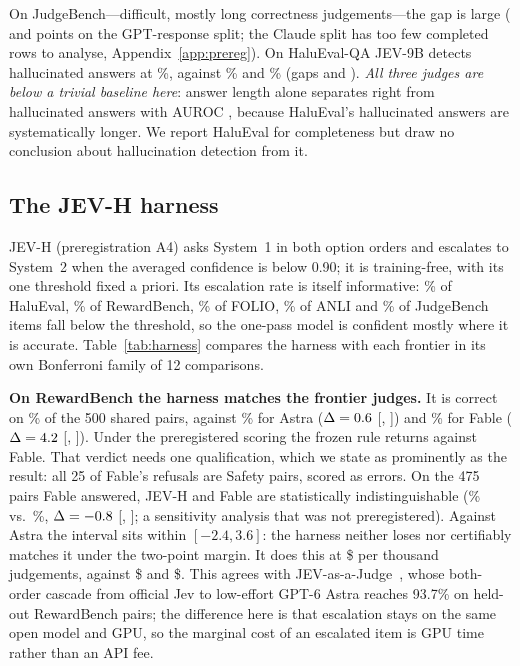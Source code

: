 On JudgeBench---difficult, mostly long correctness judgements---the gap is large (\DeltaJbgptAstra{} and \DeltaJbgptFable{} points on the GPT-response split; the Claude split has too few completed rows to analyse, Appendix~\ref{app:prereg}).
On HaluEval-QA JEV-9B detects hallucinated answers at \AccHaluSone\%, against \AccHaluAstra\% and \AccHaluFable\% (gaps \DeltaHaluAstra{} and \DeltaHaluFable).
\emph{All three judges are below a trivial baseline here}: answer length alone separates right from hallucinated answers with AUROC \HaluLenAuroc, because HaluEval's hallucinated answers are systematically longer.
We report HaluEval for completeness but draw no conclusion about hallucination detection from it.




\subsection{The JEV-H harness}
\label{sec:harness-results}


JEV-H (preregistration A4) asks System~1 in both option orders and escalates to System~2 when the averaged confidence is below 0.90; it is training-free, with its one threshold fixed a priori.
Its escalation rate is itself informative: \EscHalueval\% of HaluEval, \EscRewardbench\% of RewardBench, \EscFolio\% of FOLIO, \EscAnli\% of ANLI and \EscJudgebench\% of JudgeBench items fall below the threshold, so the one-pass model is confident mostly where it is accurate.
Table~\ref{tab:harness} compares the harness with each frontier in its own Bonferroni family of 12 comparisons.

\textbf{On RewardBench the harness matches the frontier judges.}
It is correct on \AccRbHarn\% of the 500 shared pairs, against \AccRbAstra\% for Astra ($\Delta=0.6$ [\LoHRbAstra, \HiHRbAstra]) and \AccRbFable\% for Fable ($\Delta=4.2$ [\LoHRbFable, \HiHRbFable]).
Under the preregistered scoring the frozen rule returns \emph{\ConclHRbFable} against Fable.
That verdict needs one qualification, which we state as prominently as the result: all 25 of Fable's refusals are Safety pairs, scored as errors.
On the 475 pairs Fable answered, JEV-H and Fable are statistically indistinguishable (\AccHRbFableAnsweredH\% vs.\ \AccHRbFableAnsweredF\%, $\Delta=-0.8$ [\LoHRbFableAnswered, \HiHRbFableAnswered]; a sensitivity analysis that was not preregistered).
Against Astra the interval sits within $[-2.4, 3.6]$: the harness neither loses nor certifiably matches it under the two-point margin.
It does this at \$\CostRbHarn{} per thousand judgements, against \$\CostRbAstra{} and \$\CostRbFable.
This agrees with JEV-as-a-Judge~\citep{jevjudge2026}, whose both-order cascade from official Jev to low-effort GPT-6 Astra reaches 93.7\% on held-out RewardBench pairs; the difference here is that escalation stays on the same open model and GPU, so the marginal cost of an escalated item is GPU time rather than an API fee.

